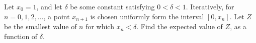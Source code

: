 Let $x_0=1$, and let $\delta$ be some constant satisfying $0<\delta<1$. Iteratively, for $n=0,1,2,\dots$, a point $x_{n+1}$ is chosen uniformly form the interval $[0,x_n]$. Let $Z$ be the smallest value of $n$ for which $x_n<\delta$. Find the expected value of $Z$, as a function of $\delta$.